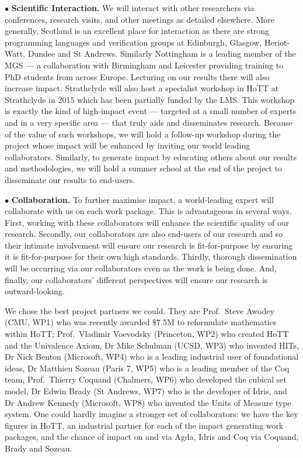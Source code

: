 \documentclass[a4paper,11pt]{article}
\begin{document}
\vspace*{0.02in} $\bullet$ {\bf Scientific Interaction.} We will
interact with other researchers via conferences,
research visits, and other meetings as detailed elsewhere. More
generally, Scotland is an excellent place for interaction as there are
strong programming languages and verification groups at Edinburgh,
Glasgow, Heriot-Watt, Dundee and St Andrews. Similarly Nottingham is a
leading member of the MGS --- a collaboration with Birmingham and
Leicester providing training to PhD students
from across Europe. Lecturing on our results there will also increase
impact. Strathclyde will also host a specialist
workshop in HoTT at Strathclyde in 2015 which has been partially
funded by the LMS. This workshop is exactly the kind of high-impact
event --- targeted at a small number of experts and in a very specific
area --- that truly aids and disseminates research. Because of the
value of such workshops, we will hold a follow-up workshop during
the project whose impact will be enhanced by inviting our
world leading collaborators. Similarly, to generate impact by
educating others about our results and methodologies, we will hold a
summer school at the end of the project to disseminate our results to
end-users.

\vspace*{0.02in}

$\bullet$ {\bf Collaboration.} To further maximise impact, a
world-leading expert will collaborate with us on each work package.
This is advantageous in several ways. First, working with these
collaborators will enhance the scientific quality of our
research. Secondly, our collaborators are also end-users of our
research and so their intimate involvement will ensure our research is
fit-for-purpose by ensuring it is fit-for-purpose for their own high
standards. Thirdly, thorough dissemination will be occurring via our
collaborators even as the work is being done. And, finally, our
collaborators' different perspectives will ensure our research is
outward-looking.

We chose the best project partners we could. They are Prof.\ Steve
Awodey (CMU, WP1) who was recently awarded $\$7.5$M to reformulate
mathematics within HoTT; Prof.\ Vladimir Voevodsky (Princeton, WP2)
who created HoTT and the Univalence Axiom, Dr Mike Schulman (UCSD,
WP3) who invented HITs, Dr Nick Benton (Microsoft, WP4) who is a
leading industrial user of foundational ideas, Dr Matthieu Sozeau
(Paris 7, WP5) who is a leading member of the Coq team, Prof.\ Thierry
Coquand (Chalmers, WP6) who developed the cubical set model, Dr Edwin
Brady (St Andrews, WP7) who is the developer of Idris, and Dr Andrew
Kennedy (Microsoft, WP8) who invented the Units of Measure type
system. One could hardly imagine a stronger set of collaborators: we
have the key figures in HoTT, an industrial partner for each of the
impact generating work packages, and the chance of impact on and via
Agda, Idris and Coq via Coquand, Brady and Sozeau.
\end{document}
